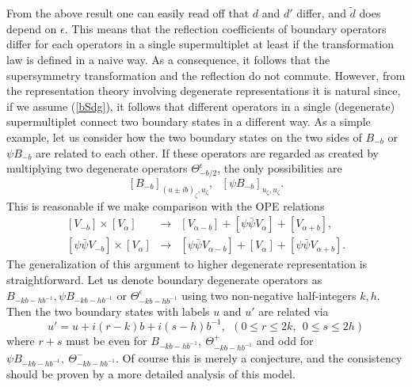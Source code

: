 \documentclass[a4paper,12pt]{article}
\newcommand{\ep}{{\epsilon}}
\begin{document}
   From the above result one can easily read off that $d$ and $d'$
 differ, and $\tilde{d}$ does depend on $\ep$.
 This means that the reflection coefficients of boundary operators
 differ for each operators in a single supermultiplet at least if
 the transformation law is defined in a naive way.
 As a consequence, it follows that the supersymmetry transformation
 and the reflection do not commute.
 However, from the representation theory involving degenerate
 representations it is natural since, if we assume (\ref{bSdg}),
 it follows that different operators in a single (degenerate)
 supermultiplet connect two boundary states in a different way.
 As a simple example, let us consider how the two boundary states
 on the two sides of $B_{-b}$ or $\psi B_{-b}$ are related to
 each other.
 If these operators are regarded as created by multiplying two
 degenerate operators $\Theta_{-b/2}^\ep$, the only possibilities are
\begin{equation}
  \left[B_{-b}\right]_{(u\pm ib)_\zeta,u_\zeta},~~~
  \left[\psi B_{-b}\right]_{u_\zeta,u_\zeta}.
\end{equation}
 This is reasonable if we make comparison with the OPE relations
\begin{equation}
\begin{array}{rcl}
  \left[V_{-b}\right]\times
  \left[V_\alpha\right] &\rightarrow&
  \left[V_{\alpha-b}\right]
 +\left[\psi\bar{\psi}V_{\alpha}\right]
 +\left[V_{\alpha+b}\right],\\
  \left[\psi\bar{\psi}V_{-b}\right]\times
  \left[V_\alpha\right] &\rightarrow&
  \left[\psi\bar{\psi}V_{\alpha-b}\right]
 +\left[V_{\alpha}\right]
 +\left[\psi\bar{\psi}V_{\alpha+b}\right].
\end{array}
\end{equation}
 The generalization of this argument to higher degenerate representation
 is straightforward.
 Let us denote boundary degenerate operators as
 $B_{-kb-hb^{-1}},\psi B_{-kb-hb^{-1}}$ or $\Theta^\ep_{-kb-hb^{-1}}$
 using two non-negative half-integers $k,h$.
 Then the two boundary states with labels $u$ and $u'$
 are related via
\begin{equation}
  u'=u+i(r-k)b+i(s-h)b^{-1},~~
 (0 \le r \le 2k,~~
  0 \le s \le 2h)
\end{equation}
 where $r+s$ must be even for $B_{-kb-hb^{-1}},~\Theta^+_{-kb-hb^{-1}}$
 and odd for $\psi B_{-kb-hb^{-1}},~ \Theta^-_{-kb-hb^{-1}}$.
 Of course this is merely a conjecture, and the consistency
 should be proven by a more detailed analysis of this model.
\end{document}
